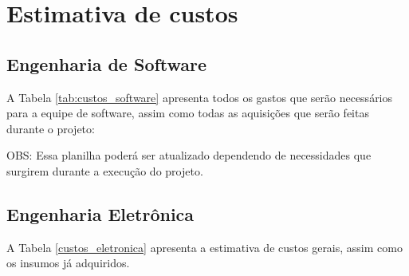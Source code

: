 \section{Estimativa de custos}

\subsection{Engenharia de Software}

A Tabela \ref{tab:custos_software} apresenta todos os gastos que serão necessários para a equipe de software, assim como todas as aquisições que serão feitas durante o projeto:

\begin{table}[h]
	\caption{Estimativa de custos de \emph{software}}
	\label{tab:custos_software}
\end{table}

OBS: Essa planilha poderá ser atualizado dependendo de necessidades que surgirem durante a execução do projeto.


\subsection{Engenharia Eletrônica}

A Tabela \ref{custos_eletronica} apresenta a estimativa de custos gerais, assim como os insumos já adquiridos.

